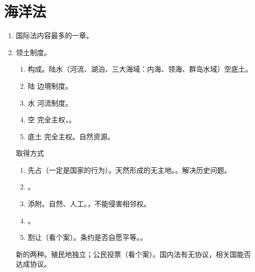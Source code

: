 \section{海洋法}
\begin{enumerate}
  \item 国际法内容最多的一章。
  \item 领土制度。
        \begin{enumerate}
          \item 构成。陆水（河流、湖泊、三大海域：内海、领海、群岛水域）空底土。
          \item 陆 \yjt 边境制度。
          \item 水 \yjt 河流制度。
          \item 空 \yjt 完全主权，。
          \item 底土 \yjt 完全主权。自然资源。
        \end{enumerate}

        \begin{kk}{取得方式}
          \begin{enumerate}
            \item 先占（一定是国家的行为）。天然形成的无主地。。解决历史问题。
            \item {}。
            \item 添附。自然、人工。，不能侵害相邻权。
            \item {}。
            \item 割让（看个案）。条约是否自愿平等。。
          \end{enumerate}
          \tcblower
          新的两种。殖民地独立；公民投票（看个案）。国内法有无协议，相关国能否达成协议。
        \end{kk}


\end{enumerate}
